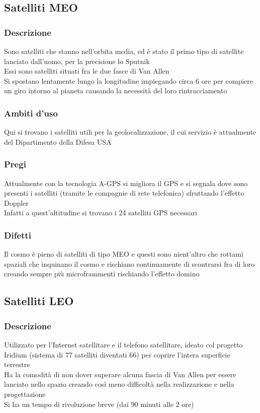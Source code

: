 \documentclass[10pt,oneside,a4paper]{article}
\begin{document}
\subsection{Satelliti MEO}
\subsubsection{Descrizione}
Sono satelliti che stanno nell'orbita media, ed è stato il primo tipo di satellite lanciato dall'uomo, per la precisione lo Sputnik\\
Essi sono satelliti situati fra le due fasce di Van Allen\\
Si spostano lentamente lungo la longitudine impiegando circa 6 ore per compiere un giro intorno al pianeta causando la necessità del loro rintracciamento
\subsubsection{Ambiti d'uso}
Qui si trovano i satelliti utili per la geolocalizzazione, il cui servizio è attualmente del Dipartimento della Difesa USA
\subsubsection{Pregi}
Attualmente con la tecnologia A-GPS si migliora il GPS e si segnala dove sono presenti i satelliti (tramite le compagnie di rete telefonica) sfruttando l'effetto Doppler\\
Infatti a quest'altitudine si trovano i 24 satelliti GPS necessari
\subsubsection{Difetti}
Il cosmo è pieno di satelliti di tipo MEO e questi sono nient'altro che rottami spaziali che inquinano il cosmo e rischiano continuamente di scontrarsi fra di loro creando sempre più microframmenti rischiando l'effetto domino
\subsection{Satelliti LEO}
\subsubsection{Descrizione}
Utilizzato per l'Internet satellitare e il telefono satellitare, ideato col progetto Iridium (sistema di 77 satelliti diventati 66) per coprire l'intera superficie terrestre\\
Ha la comodità di non dover superare alcuna fascia di Van Allen per essere lanciato nello spazio creando così meno difficoltà nella realizzazione e nella progettazione\\
Si ha un tempo di rivoluzione breve (dai 90 minuti alle 2 ore)
\end{document}
